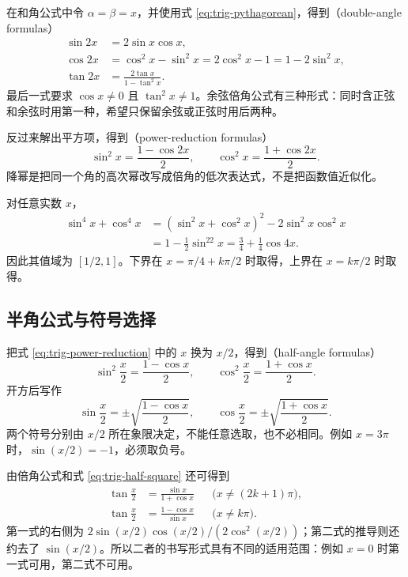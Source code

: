 \documentclass[UTF8]{ctexart}
\begin{document}
在和角公式中令 $\alpha=\beta=x$，并使用式 \eqref{eq:trig-pythagorean}，得到（double-angle formulas）
\begin{align}
  \sin2x&=2\sin x\cos x,\label{eq:trig-double-sin}\\
  \cos2x&=\cos^2x-\sin^2x
  =2\cos^2x-1=1-2\sin^2x,\label{eq:trig-double-cos}\\
  \tan2x&=\frac{2\tan x}{1-\tan^2x}.\label{eq:trig-double-tan}
\end{align}
最后一式要求 $\cos x\ne0$ 且 $\tan^2x\ne1$。余弦倍角公式有三种形式：同时含正弦和余弦时用第一种，希望只保留余弦或正弦时用后两种。

反过来解出平方项，得到（power-reduction formulas）
\begin{equation}\label{eq:trig-power-reduction}
  \boxed{\sin^2x=\frac{1-\cos2x}{2},\qquad
  \cos^2x=\frac{1+\cos2x}{2}}.
\end{equation}
降幂是把同一个角的高次幂改写成倍角的低次表达式，不是把函数值近似化。

\begin{example}[四次幂的化简与范围]
对任意实数 $x$，
\begin{align*}
  \sin^4x+\cos^4x
  &=(\sin^2x+\cos^2x)^2-2\sin^2x\cos^2x\\
  &=1-\frac12\sin^22x=\frac34+\frac14\cos4x.
\end{align*}
因此其值域为 $[1/2,1]$。下界在 $x=\pi/4+k\pi/2$ 时取得，上界在 $x=k\pi/2$ 时取得。
\end{example}

\subsection{半角公式与符号选择}

把式 \eqref{eq:trig-power-reduction} 中的 $x$ 换为 $x/2$，得到（half-angle formulas）
\begin{equation}\label{eq:trig-half-square}
  \sin^2\frac x2=\frac{1-\cos x}{2},\qquad
  \cos^2\frac x2=\frac{1+\cos x}{2}.
\end{equation}
开方后写作
\begin{equation}\label{eq:trig-half-root}
  \sin\frac x2=\pm\sqrt{\frac{1-\cos x}{2}},\qquad
  \cos\frac x2=\pm\sqrt{\frac{1+\cos x}{2}}.
\end{equation}
两个符号分别由 $x/2$ 所在象限决定，不能任意选取，也不必相同。例如 $x=3\pi$ 时，$\sin(x/2)=-1$，必须取负号。

由倍角公式和式 \eqref{eq:trig-half-square} 还可得到
\begin{align}
  \tan\frac x2&=\frac{\sin x}{1+\cos x}
  &&\bigl(x\ne(2k+1)\pi\bigr),\label{eq:trig-half-tan-a}\\
  \tan\frac x2&=\frac{1-\cos x}{\sin x}
  &&\bigl(x\ne k\pi\bigr).\label{eq:trig-half-tan-b}
\end{align}
第一式的右侧为 $2\sin(x/2)\cos(x/2)/(2\cos^2(x/2))$；第二式的推导则还约去了 $\sin(x/2)$。所以二者的书写形式具有不同的适用范围：例如 $x=0$ 时第一式可用，第二式不可用。
\end{document}

